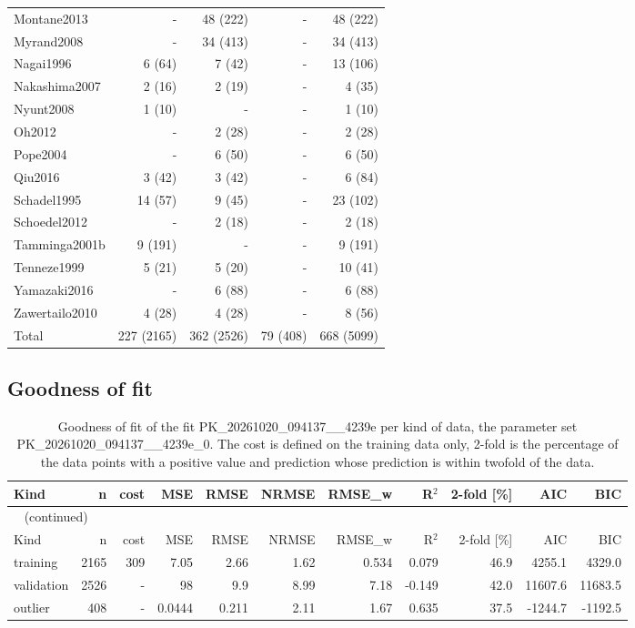 \begin{longtable}{lrrrr}
Montane2013 & - & 48 (222) & - & 48 (222) \\
Myrand2008 & - & 34 (413) & - & 34 (413) \\
Nagai1996 & 6 (64) & 7 (42) & - & 13 (106) \\
Nakashima2007 & 2 (16) & 2 (19) & - & 4 (35) \\
Nyunt2008 & 1 (10) & - & - & 1 (10) \\
Oh2012 & - & 2 (28) & - & 2 (28) \\
Pope2004 & - & 6 (50) & - & 6 (50) \\
Qiu2016 & 3 (42) & 3 (42) & - & 6 (84) \\
Schadel1995 & 14 (57) & 9 (45) & - & 23 (102) \\
Schoedel2012 & - & 2 (18) & - & 2 (18) \\
Tamminga2001b & 9 (191) & - & - & 9 (191) \\
Tenneze1999 & 5 (21) & 5 (20) & - & 10 (41) \\
Yamazaki2016 & - & 6 (88) & - & 6 (88) \\
Zawertailo2010 & 4 (28) & 4 (28) & - & 8 (56) \\
Total & 227 (2165) & 362 (2526) & 79 (408) & 668 (5099) \\
\end{longtable}

\subsection{Goodness of fit}

\begin{longtable}{lrrrrrrrrrr}
\caption{Goodness of fit of the fit PK\_20261020\_094137\_\_4239e per kind of data, the parameter set PK\_20261020\_094137\_\_4239e\_0. The cost is defined on the training data only, 2-fold is the percentage of the data points with a positive value and prediction whose prediction is within twofold of the data.}\label{tab:metrics:PK_20261020_094137__4239e} \\
\toprule
Kind & n & cost & MSE & RMSE & NRMSE & RMSE\_w & R\ensuremath{^{2}} & 2-fold [\%] & AIC & BIC \\
\midrule
\endfirsthead
\multicolumn{11}{l}{\small\tablename~\thetable{} (continued)} \\
\toprule
Kind & n & cost & MSE & RMSE & NRMSE & RMSE\_w & R\ensuremath{^{2}} & 2-fold [\%] & AIC & BIC \\
\midrule
\endhead
\bottomrule
\endlastfoot
training & 2165 & 309 & 7.05 & 2.66 & 1.62 & 0.534 & 0.079 & 46.9 & 4255.1 & 4329.0 \\
validation & 2526 & - & 98 & 9.9 & 8.99 & 7.18 & -0.149 & 42.0 & 11607.6 & 11683.5 \\
outlier & 408 & - & 0.0444 & 0.211 & 2.11 & 1.67 & 0.635 & 37.5 & -1244.7 & -1192.5 \\
\end{longtable}

